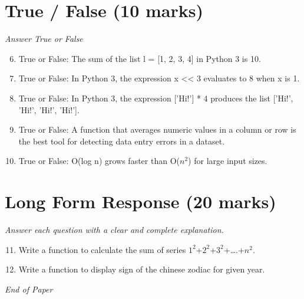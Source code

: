 \documentclass[12pt]{article}
\begin{document}
\section*{True / False (10 marks)}
\textit{Answer True or False}
\begin{enumerate}[label=\arabic*.]
\setcounter{enumi}{5}
\item True or False: The sum of the list l = [1, 2, 3, 4] in Python 3 is 10.
\item True or False: In Python 3, the expression x \textless{}\textless{} 3 evaluates to 8 when x is 1.
\item True or False: In Python 3, the expression ['Hi!'] * 4 produces the list ['Hi!', 'Hi!', 'Hi!', 'Hi!'].
\item True or False: A function that averages numeric values in a column or row is the best tool for detecting data entry errors in a dataset.
\item True or False: O(log n) grows faster than O($n^2$) for large input sizes.
\end{enumerate}

\section*{Long Form Response (20 marks)}
\textit{Answer each question with a clear and complete explanation.}
\begin{enumerate}[label=\arabic*.]
\setcounter{enumi}{10}
\item Write a function to calculate the sum of series $1^2$+$2^2$+$3^2$+….+$n^2$.
\item Write a function to display sign of the chinese zodiac for given year.
\end{enumerate}

\vfill
\noindent\textit{End of Paper}
\end{document}
